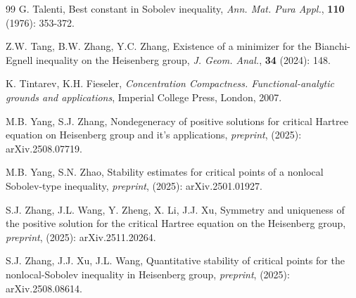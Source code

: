 \documentclass[11pt]{article}
\begin{document}
\begin{thebibliography}{99}
  G. Talenti,
Best constant in Sobolev inequality, {\em Ann. Mat. Pura Appl.}, {\bf 110} (1976): 353-372.

 Z.W. Tang, B.W. Zhang, Y.C. Zhang,
Existence of a minimizer for the Bianchi-Egnell inequality on the Heisenberg group,
{\em J. Geom. Anal.}, {\bf 34} (2024): 148.

 K. Tintarev, K.H. Fieseler,
{\em Concentration Compactness. Functional-analytic grounds
and applications}, Imperial College Press, London, 2007.

 M.B. Yang, S.J. Zhang,
Nondegeneracy of positive solutions for critical Hartree equation on Heisenberg group and it's applications,
{\em preprint}, (2025): arXiv.2508.07719.

 M.B. Yang, S.N. Zhao,
Stability estimates for critical points of a nonlocal Sobolev-type inequality,
 {\em preprint}, (2025): arXiv.2501.01927.





S.J. Zhang, J.L. Wang, Y. Zheng, X. Li, J.J. Xu,
Symmetry and uniqueness of the positive solution for the critical Hartree equation on the Heisenberg group, {\em preprint}, (2025): arXiv.2511.20264.


 S.J. Zhang, J.J. Xu, J.L. Wang,
Quantitative stability of critical points for the nonlocal-Sobolev inequality in Heisenberg group,
{\em preprint}, (2025): arXiv.2508.08614.






\end{thebibliography}
\end{document}
